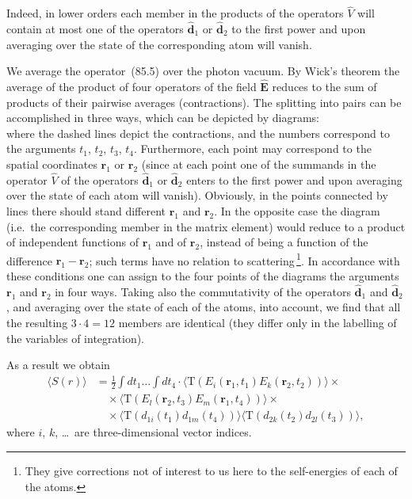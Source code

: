 Indeed, in lower orders each member in the products of the operators $\hat{V}$ will contain at most one of the operators $\hat{\mathbf{d}}_1$ or $\hat{\mathbf{d}}_2$ to the first power and upon averaging over the state of the corresponding atom will vanish.

We average the operator~(85.5) over the photon vacuum. By Wick's theorem the average of the product of four operators of the field $\hat{\mathbf{E}}$ reduces to the sum of products of their pairwise averages (contractions). The splitting into pairs can be accomplished in three ways, which can be depicted by diagrams:
\begin{equation}
\tag{85.6}
\end{equation}
where the dashed lines depict the contractions, and the numbers correspond to the arguments $t_1$, $t_2$, $t_3$, $t_4$. Furthermore, each point may correspond to the spatial coordinates $\mathbf{r}_1$ or $\mathbf{r}_2$ (since at each point one of the summands in the operator $\hat{V}$ of the operators $\hat{\mathbf{d}}_1$ or $\hat{\mathbf{d}}_2$ enters to the first power and upon averaging over the state of each atom will vanish). Obviously, in the points connected by lines there should stand different $\mathbf{r}_1$ and $\mathbf{r}_2$. In the opposite case the diagram (i.e.\ the corresponding member in the matrix element) would reduce to a product of independent functions of $\mathbf{r}_1$ and of $\mathbf{r}_2$, instead of being a function of the difference $\mathbf{r}_1 - \mathbf{r}_2$; such terms have no relation to scattering\,\footnote{They give corrections not of interest to us here to the self-energies of each of the atoms.}. In accordance with these conditions one can assign to the four points of the diagrams the arguments $\mathbf{r}_1$ and $\mathbf{r}_2$ in four ways. Taking also the commutativity of the operators $\hat{\mathbf{d}}_1$ and $\hat{\mathbf{d}}_2$, and averaging over the state of each of the atoms, into account, we find that all the resulting $3\cdot 4 = 12$ members are identical (they differ only in the labelling of the variables of integration).

As a result we obtain
\begin{equation}
\begin{split}
\langle S(r)\rangle &= \frac{1}{2}\int dt_1\ldots\int dt_4\cdot\langle\mathrm{T}(E_i(\mathbf{r}_1,t_1)E_k(\mathbf{r}_2,t_2))\rangle\times\\
&\quad\times\langle\mathrm{T}(E_l(\mathbf{r}_2,t_3)E_m(\mathbf{r}_1,t_4))\rangle\times\\
&\quad\times\langle\mathrm{T}(d_{1i}(t_1)d_{1m}(t_4))\rangle\langle\mathrm{T}(d_{2k}(t_2)d_{2l}(t_3))\rangle,
\end{split}
\tag{85.7}
\end{equation}
where $i$, $k$, \ldots\ are three-dimensional vector indices.

